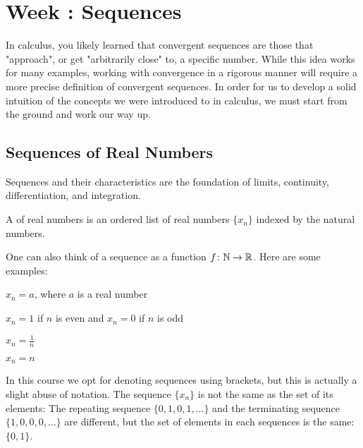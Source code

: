 \documentclass[../notes.tex]{subfiles}
\begin{document}
\section{Week \theweek: Sequences}

In calculus, you likely learned that convergent sequences are those that "approach", or get "arbitrarily close" to, a specific number. While this idea works for many examples, working with convergence in a rigorous manner will require a more precise definition of convergent sequences. In order for us to develop a solid intuition of the concepts we were introduced to in calculus, we must start from the ground and work our way up.

\subsection{Sequences of Real Numbers}

Sequences and their characteristics are the foundation of limits, continuity, differentiation, and integration. 

\begin{definition}[Sequence]
\label{def:sequence}
    A  of real numbers is an ordered list of real numbers $\{x_n\}$ indexed by the natural numbers.
\end{definition}

One can also think of a sequence as a function $f\colon \mathbb N\to \mathbb R$. Here are some examples:

\begin{example} 
\label{ex-sequences}
\phantom{ }
    \begin{listalph}
        \item $x_n=a$, where $a$ is a real number
        \item $x_n=1$ if $n$ is even and $x_n=0$ if $n$ is odd
        \item $x_n=\frac{1}{n}$
        \item $x_n=n$
    \end{listalph}
\end{example}

\begin{warn}
    In this course we opt for denoting sequences using brackets, but this is actually a slight abuse of notation. The sequence $\{x_n\}$ is not the same as the set of its elements: The repeating sequence $\{0,1,0,1,\dots\}$ and the terminating sequence $\{1,0,0,0,\dots\}$ are different, but the set of elements in each sequences is the same: $\{0,1\}$.
\end{warn}
\end{document}
